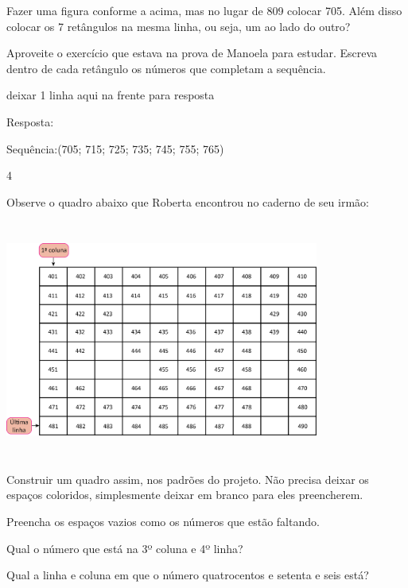 \begin{escolha}
Fazer uma figura conforme a acima, mas no lugar de 809 colocar 705. Além
disso colocar os 7 retângulos na mesma linha, ou seja, um ao lado do
outro?

Aproveite o exercício que estava na prova de Manoela para estudar.
Escreva dentro de cada retângulo os números que completam a sequência.

deixar 1 linha aqui na frente para resposta

Resposta:

Sequência:(705; 715; 725; 735; 745; 755; 765)

\num{4}

Observe o quadro abaixo que Roberta encontrou no caderno de seu irmão:

\includegraphics[width=4.05869in,height=3.09193in]{media/image30.png}

Construir um quadro assim, nos padrões do projeto. Não precisa deixar os
espaços coloridos, simplesmente deixar em branco para eles preencherem.

\begin{escolha}
\item
  Preencha os espaços vazios como os números que estão faltando.

\item
  Qual o número que está na 3º coluna e 4º linha?


\item
  Qual a linha e coluna em que o número quatrocentos e setenta e seis
  está?


\end{escolha}
\end{escolha}
